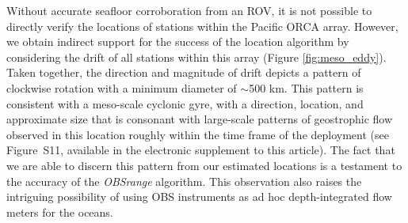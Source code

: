 Without accurate seafloor corroboration from an ROV, it is not possible to directly verify the locations of stations within the Pacific ORCA array. However, we  obtain indirect support for the success of the location algorithm by considering the drift of all stations within this array (Figure \ref{fig:meso_eddy}). Taken together, the direction and magnitude of drift depicts a pattern of clockwise rotation with a minimum diameter of $\sim$500 km. This pattern is consistent with a meso-scale cyclonic gyre, with a direction, location, and approximate size that is consonant with large-scale patterns of geostrophic flow observed in this location roughly within the time frame of the deployment (see Figure~S11, available in the electronic supplement to this article). The fact that we are able to discern this pattern from our estimated locations is a testament to the accuracy of the \textit{OBSrange} algorithm. This observation also raises the intriguing possibility of using OBS instruments as ad hoc depth-integrated flow meters for the oceans. 